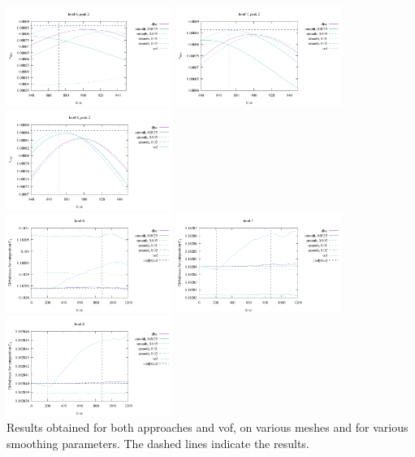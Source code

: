 \begin{itemize}
\begin{minipage}{.99\linewidth}
\begin{center}
\includegraphics[width=5.4cm]{images/benchmark_vaks97/vrms6_peak2}
\includegraphics[width=5.4cm]{images/benchmark_vaks97/vrms7_peak2}
\includegraphics[width=5.4cm]{images/benchmark_vaks97/vrms8_peak2}\\
\includegraphics[width=5.4cm]{images/benchmark_vaks97/C1_6}
\includegraphics[width=5.4cm]{images/benchmark_vaks97/C1_7}
\includegraphics[width=5.4cm]{images/benchmark_vaks97/C1_8}\\
{\captionfont Results obtained for both approaches and vof, on various meshes and for 
various smoothing parameters. The dashed lines indicate the  results.}
\end{center}
\end{minipage}



\end{itemize}
